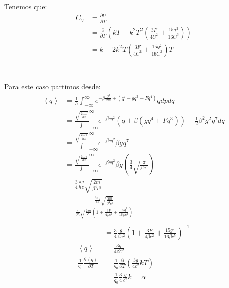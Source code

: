 \documentclass{report}
\begin{document}
\section{}

Tenemos que:
\begin{align*}
	C_V &= \frac{\partial U}{\partial T}\\
	&= \frac{\partial}{\partial T} \left(kT + k^2 T^2 \left( \frac{3 F}{4C^2} + \frac{15 g^2}{16 C^3} \right)\right)\\
	&= k + 2k^2 T \left( \frac{3 F}{4C^2} + \frac{15 g^2}{16 C^3} \right)T\\
\end{align*}

\section{}

Para este caso partimos desde:
\begin{align*}
	\left< q \right> &= \frac{1}{h} \int_{-\infty}^{\infty} e^{-\beta \frac{\beta^2}{2m} + \left( q^i - gq^3 - Fq^4 \right)} q dp dq\\
	&= \frac{\sqrt{\frac{2m \beta}{h z}}} \int_{-\infty}^{\infty} e^{-\beta cq^2} \left( q + \beta \left( g q^4 + Fq^3 \right) \right) + \frac{1}{2} \beta^2 g^2 q^7 dq\\
	&= \frac{\sqrt{\frac{2m\pi}{hz}}} \int_{-\infty}^{\infty} e^{-\beta cq^2} \beta g q^7\\
	&= \frac{\sqrt{\frac{2m\pi}{hz}}} \int_{-\infty}^{\infty} e^{-\beta cq^2} \beta g \left( \frac{3}{4} \sqrt{\frac{\pi}{\beta c^5}} \right)\\
	&= \frac{3}{4} \frac{\pi g}{hz} \sqrt{\frac{2m}{\beta^4 c^5}}\\
	&= \frac{\frac{3\pi g}{4h} \sqrt{\frac{2m}{\beta^4 c^3}}}{\frac{\pi}{\beta h} \sqrt{\frac{2m}{c}} \left( 1 + \frac{3F}{4\beta c^2} + \frac{15 g^2}{16\beta c^2} \right)}\\
\end{align*}
\begin{align*}
	&= \frac{3}{4} \frac{g}{\beta c^2} \left( 1 + \frac{3F}{4\beta c^2} + \frac{15 g^2}{16 \beta c^5} \right)^{-1}\\
	\left< q \right> &= \frac{3g}{4\beta c^2}\\
	\frac{1}{q_0} \frac{\partial \left< q \right>}{\partial T} &= \frac{1}{q_0} \frac{\partial}{\partial T} \left( \frac{3g}{4c^2} kT \right)\\
	&= \frac{1}{q_0} \frac{3}{4} \frac{g}{c^2} k = \alpha
\end{align*}
\end{document}
